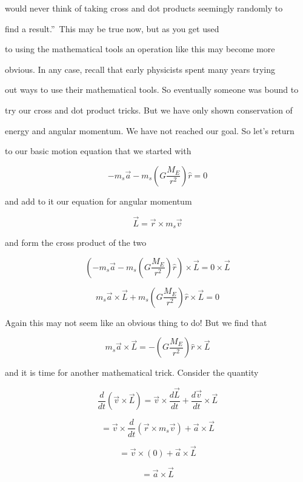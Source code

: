 would never think of taking cross and dot products seemingly randomly to

find a result.\textquotedblright\ This may be true now, but as you get used

to using the mathematical tools an operation like this may become more

obvious. In any case, recall that early physicists spent many years trying

out ways to use their mathematical tools. So eventually someone was bound to

try our cross and dot product tricks. But we have only shown conservation of

energy and angular momentum. We have not reached our goal. So let's return

to our basic motion equation that we started with%

$$-m_{s}\overrightarrow{a}-m_{s}\left( G\frac{M_{E}}{r^{2}}\right) \hat{r}=0 $$

and add to it our equation for angular momentum 

$$\overrightarrow{L}=\overrightarrow{r}\times m_{s}\overrightarrow{v}$$

and form the cross product of the two%

$$\left( -m_{s}\overrightarrow{a}-m_{s}\left( G\frac{M_{E}}{r^{2}}\right) \hat{r}\right) \times \overrightarrow{L}=0\times \overrightarrow{L}$$

$$m_{s}\overrightarrow{a}\times \overrightarrow{L}+m_{s}\left( G\frac{M_{E}}{r^{2}}\right) \hat{r}\times \overrightarrow{L}=0 $$

Again this may not seem like an obvious thing to do! But we find that 

$$m_{s}\overrightarrow{a}\times \overrightarrow{L}=-\left( G\frac{M_{E}}{r^{2}}\right) \hat{r}\times \overrightarrow{L}$$

and it is time for another mathematical trick. Consider the quantity%

$$\frac{d}{dt}\left( \overrightarrow{v}\times \overrightarrow{L}\right) =\overrightarrow{v}\times \frac{d\overrightarrow{L}}{dt}+\frac{d\overrightarrow{v}}{dt}\times \overrightarrow{L}$$

$$=\overrightarrow{v}\times \frac{d}{dt}\left( \overrightarrow{r}\times m_{s}\overrightarrow{v}\right) +\overrightarrow{a}\times \overrightarrow{L}$$

$$=\overrightarrow{v}\times \left( 0\right) +\overrightarrow{a}\times \overrightarrow{L}$$

$$=\overrightarrow{a}\times \overrightarrow{L}$$

